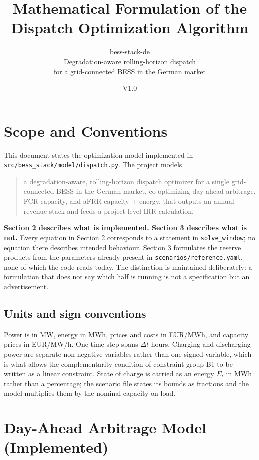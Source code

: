 \documentclass[11pt,a4paper]{article}
\title{Mathematical Formulation of the Dispatch Optimization Algorithm}
\author{bess-stack-de \\ Degradation-aware rolling-horizon dispatch \\
for a grid-connected BESS in the German market}
\date{V1.0}
\numberwithin{equation}{section}
\begin{document}
\maketitle
\thispagestyle{fancy}

\section{Scope and Conventions}

This document states the optimization model implemented in
\nolinkurl{src/bess_stack/model/dispatch.py}. The project models

\begin{quote}
a degradation-aware, rolling-horizon dispatch optimizer for a single
grid-connected BESS in the German market, co-optimizing day-ahead arbitrage,
FCR capacity, and aFRR capacity + energy, that outputs an annual revenue stack
and feeds a project-level IRR calculation.
\end{quote}

\textbf{Section 2 describes what is implemented. Section 3 describes what is
not.} Every equation in Section 2 corresponds to a statement in
\nolinkurl{solve_window}; no equation there describes intended behaviour. Section 3
formulates the reserve products from the parameters already present in
\nolinkurl{scenarios/reference.yaml}, none of which the code reads today. The
distinction is maintained deliberately: a formulation that does not say which
half is running is not a specification but an advertisement.

\subsection{Units and sign conventions}

Power is in MW, energy in MWh, prices and costs in EUR/MWh, and capacity prices
in EUR/MW/h. One time step spans $\Delta t$ hours. Charging and discharging
power are separate non-negative variables rather than one signed variable, which
is what allows the complementarity condition of constraint group B1 to be written
as a linear constraint. State of charge is carried as an energy $E_t$ in MWh rather
than a percentage; the scenario file states its bounds as fractions and the
model multiplies them by the nominal capacity on load.

\section{Day-Ahead Arbitrage Model (Implemented)}
\end{document}

